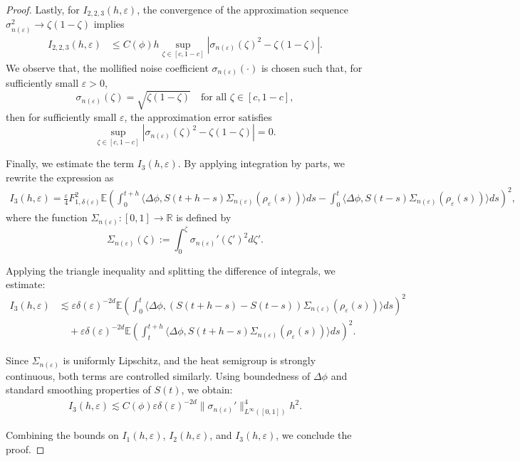 \documentclass[10pt,a4paper]{amsart}
\def\leq{\leqslant}
\begin{document}
\begin{proof}
Lastly, for $ I_{2,2,3}(h,\varepsilon) $, the convergence of the approximation sequence $ \sigma_{n(\varepsilon)}^2 \to \zeta(1 - \zeta) $ implies
\begin{align*}
I_{2,2,3}(h,\varepsilon)
&\leq C(\phi) h \sup_{\zeta \in [c, 1 - c]} \left| \sigma_{n(\varepsilon)}(\zeta)^2 - \zeta(1 - \zeta) \right|.
\end{align*}
We observe that, the mollified noise coefficient $ \sigma_{n(\varepsilon)}(\cdot) $ is chosen such that, for sufficiently small $\varepsilon>0$, 
$$
\sigma_{n(\varepsilon)}(\zeta) = \sqrt{\zeta(1 - \zeta)} \quad \text{for all } \zeta \in [c, 1 - c],
$$
then for sufficiently small $ \varepsilon $, the approximation error satisfies
$$
\sup_{\zeta \in [c, 1 - c]} \left| \sigma_{n(\varepsilon)}(\zeta)^2 - \zeta(1 - \zeta) \right| = 0.
$$






Finally, we estimate the term $ I_3(h,\varepsilon) $. By applying integration by parts, we rewrite the expression as
\begin{align*}
I_3(h,\varepsilon)
= \frac{\varepsilon}{4} F_{1,\delta(\varepsilon)}^2 
\mathbb{E} \left( 
\int_0^{t+h} \langle \Delta \phi, S(t+h - s) \Sigma_{n(\varepsilon)}(\rho_{\varepsilon}(s)) \rangle ds 
- \int_0^t \langle \Delta \phi, S(t - s) \Sigma_{n(\varepsilon)}(\rho_{\varepsilon}(s)) \rangle ds 
\right)^2,
\end{align*}
where the function $ \Sigma_{n(\varepsilon)} \colon [0,1] \to \mathbb{R} $ is defined by
$$
\Sigma_{n(\varepsilon)}(\zeta) := \int_0^{\zeta} \sigma_{n(\varepsilon)}'(\zeta')^2 d\zeta'.
$$

Applying the triangle inequality and splitting the difference of integrals, we estimate:
\begin{align*}
I_3(h,\varepsilon)
&\lesssim \varepsilon \delta(\varepsilon)^{-2d} 
\mathbb{E} \left( \int_0^t \langle \Delta \phi, \left( S(t+h - s) - S(t - s) \right) \Sigma_{n(\varepsilon)}(\rho_{\varepsilon}(s)) \rangle ds \right)^2 \\
&\quad + \varepsilon \delta(\varepsilon)^{-2d} 
\mathbb{E} \left( \int_t^{t+h} \langle \Delta \phi, S(t+h - s) \Sigma_{n(\varepsilon)}(\rho_{\varepsilon}(s)) \rangle ds \right)^2.
\end{align*}

Since $ \Sigma_{n(\varepsilon)} $ is uniformly Lipschitz, and the heat semigroup is strongly continuous, both terms are controlled similarly. Using boundedness of $ \Delta \phi $ and standard smoothing properties of $ S(t) $, we obtain:
\begin{align*}
I_3(h,\varepsilon) 
\lesssim C(\phi) \varepsilon \delta(\varepsilon)^{-2d} 
\| \sigma_{n(\varepsilon)}' \|_{L^{\infty}([0,1])}^4 h^2.
\end{align*}

Combining the bounds on $ I_1(h,\varepsilon) $, $ I_2(h,\varepsilon) $, and $ I_3(h,\varepsilon) $, we conclude the proof.

\end{proof}
\end{document}
